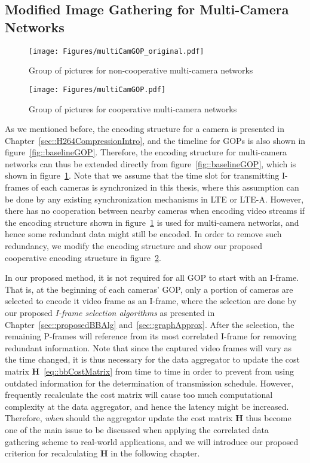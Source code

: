 {\subsection{Modified Image Gathering for Multi-Camera Networks}
%
\begin{figure}
\begin{center}
\texttt{[image: Figures/multiCamGOP\_original.pdf]}
\caption{\label{fig::multiCamGOP_original}Group of pictures for non-cooperative multi-camera networks}
\end{center}
\end{figure}
%
\begin{figure}
\begin{center}
\texttt{[image: Figures/multiCamGOP.pdf]}
\caption{\label{fig::multiCamGOP}Group of pictures for cooperative multi-camera networks}
\end{center}
\end{figure}
%
As we mentioned before, the encoding structure for a camera is presented in Chapter~\ref{sec::H264CompressionIntro}, and the timeline for GOPs is also shown in figure~\ref{fig::baselineGOP}.
Therefore, the encoding structure for multi-camera networks can thus be extended directly from figure~\ref{fig::baselineGOP}, which is shown in figure~\ref{fig::multiCamGOP_original}.
Note that we assume that the time slot for transmitting I-frames of each cameras is synchronized in this thesis, where this assumption can be done by any existing synchronization mechanisms in LTE or LTE-A.
However, there has no cooperation between nearby cameras when encoding video streams if the encoding structure shown in figure~\ref{fig::multiCamGOP_original} is used for multi-camera networks, and hence some redundant data might still be encoded.
In order to remove such redundancy, we modify the encoding structure and show our proposed cooperative encoding structure in figure~\ref{fig::multiCamGOP}.

In our proposed method, it is not required for all GOP to start with an I-frame.
That is, at the beginning of each cameras' GOP, only a portion of cameras are selected to encode it video frame as an I-frame, where the selection are done by our proposed \emph{I-frame selection algorithms} as presented in Chapter~\ref{sec::proposedBBAlg} and~\ref{sec::graphApprox}.
After the selection, the remaining P-frames will reference from its most correlated I-frame for removing redundant information.
Note that since the captured video frames will vary as the time changed, it is thus necessary for the data aggregator to update the cost matrix $\mathbf{H}$~\eqref{eq::bbCostMatrix} from time to time in order to prevent from using outdated information for the determination of transmission schedule.
However, frequently recalculate the cost matrix will cause too much computational complexity at the data aggregator, and hence the latency might be increased.
Therefore, \emph{when} should the aggregator update the cost matrix $\mathbf{H}$ thus become one of the main issue to be discussed when applying the correlated data gathering scheme to real-world applications, and we will introduce our proposed criterion for recalculating $\mathbf{H}$ in the following chapter.
%
}
